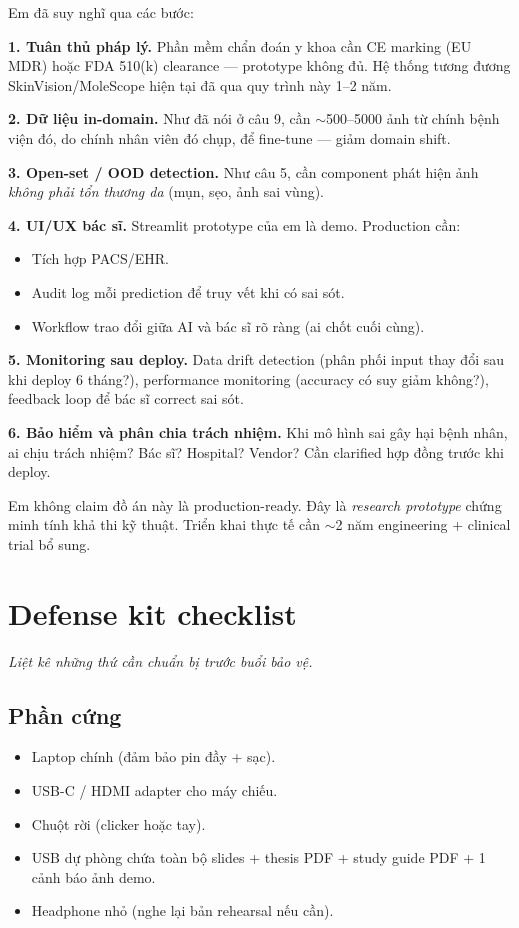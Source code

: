 \documentclass[11pt,a4paper]{article}
\begin{document}
\begin{answer}
Em đã suy nghĩ qua các bước:

\textbf{1. Tuân thủ pháp lý.} Phần mềm chẩn đoán y khoa cần CE marking (EU MDR) hoặc FDA 510(k) clearance --- prototype không đủ. Hệ thống tương đương SkinVision/MoleScope hiện tại đã qua quy trình này 1--2 năm.

\textbf{2. Dữ liệu in-domain.} Như đã nói ở câu 9, cần $\sim$500--5000 ảnh từ chính bệnh viện đó, do chính nhân viên đó chụp, để fine-tune --- giảm domain shift.

\textbf{3. Open-set / OOD detection.} Như câu 5, cần component phát hiện ảnh \textit{không phải tổn thương da} (mụn, sẹo, ảnh sai vùng).

\textbf{4. UI/UX bác sĩ.} Streamlit prototype của em là demo. Production cần:
\begin{itemize}[leftmargin=*]
  \item Tích hợp PACS/EHR.
  \item Audit log mỗi prediction để truy vết khi có sai sót.
  \item Workflow trao đổi giữa AI và bác sĩ rõ ràng (ai chốt cuối cùng).
\end{itemize}

\textbf{5. Monitoring sau deploy.} Data drift detection (phân phối input thay đổi sau khi deploy 6 tháng?), performance monitoring (accuracy có suy giảm không?), feedback loop để bác sĩ correct sai sót.

\textbf{6. Bảo hiểm và phân chia trách nhiệm.} Khi mô hình sai gây hại bệnh nhân, ai chịu trách nhiệm? Bác sĩ? Hospital? Vendor? Cần clarified hợp đồng trước khi deploy.

Em không claim đồ án này là production-ready. Đây là \textit{research prototype} chứng minh tính khả thi kỹ thuật. Triển khai thực tế cần $\sim$2 năm engineering + clinical trial bổ sung.
\end{answer}

\section{Defense kit checklist}

\textit{Liệt kê những thứ cần chuẩn bị trước buổi bảo vệ.}

\subsection{Phần cứng}
\begin{itemize}[leftmargin=*, itemsep=2pt]
  \item Laptop chính (đảm bảo pin đầy + sạc).
  \item USB-C / HDMI adapter cho máy chiếu.
  \item Chuột rời (clicker hoặc tay).
  \item USB dự phòng chứa toàn bộ slides + thesis PDF + study guide PDF + 1 cảnh báo ảnh demo.
  \item Headphone nhỏ (nghe lại bản rehearsal nếu cần).
\end{itemize}
\end{document}
